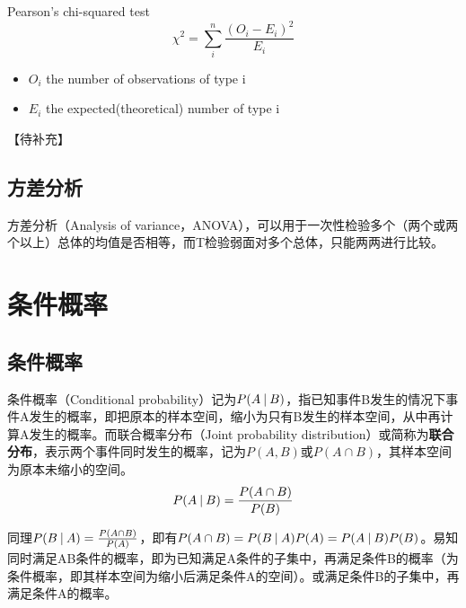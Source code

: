 \documentclass[11pt]{article}
\begin{document}
Pearson's chi-squared test
\begin{equation*}
    \chi^2 = \sum_i^n \frac{(O_i - E_i)^2}{E_i}
\end{equation*}

\begin{itemize}
    \item $O_i$ the number of observations of type i
    \item $E_i$ the expected(theoretical) number of type i
\end{itemize}

【待补充】

\subsection{方差分析}

方差分析（Analysis of variance，ANOVA），可以用于一次性检验多个（两个或两个以上）总体的均值是否相等，而T检验弱面对多个总体，只能两两进行比较。

\section{条件概率}

\subsection{条件概率}

条件概率（Conditional probability）记为$P(A\:\vert\: B)$，指已知事件B发生的情况下事件A发生的概率，即把原本的样本空间，缩小为只有B发生的样本空间，从中再计算A发生的概率。而联合概率分布（Joint probability distribution）或简称为\textbf{联合分布}，表示两个事件同时发生的概率，记为$P(A,B)$或$P(A\cap B)$，其样本空间为原本未缩小的空间。
\begin{equation*}
    P(A \:\vert\: B) = \frac{P(A \cap B)}{P(B)}
\end{equation*}

\begin{remark}
    同理$P(B\:\vert\: A) = \frac{P(A \cap B)}{P(A)}$，即有$P(A \cap B) = P(B\:\vert\: A)P(A) = P(A\:\vert\: B)P(B)$。易知同时满足AB条件的概率，即为已知满足A条件的子集中，再满足条件B的概率（为条件概率，即其样本空间为缩小后满足条件A的空间）。或满足条件B的子集中，再满足条件A的概率。
\end{remark}
\end{document}
